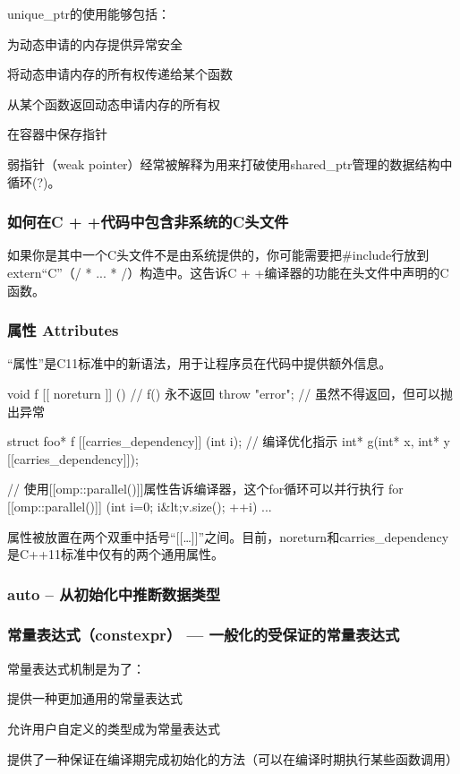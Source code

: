 unique_ptr的使用能够包括：
\begindot
\item 为动态申请的内存提供异常安全
\item 将动态申请内存的所有权传递给某个函数
\item 从某个函数返回动态申请内存的所有权
\item 在容器中保存指针
\myenddot

弱指针（weak pointer）经常被解释为用来打破使用shared_ptr管理的数据结构中循环(?)。

\subsubsection{如何在C + +代码中包含非系统的C头文件}
如果你是其中一个C头文件不是由系统提供的，你可能需要把\#include行放到extern“C”（/ * ... * /）构造中。这告诉C + +编译器的功能在头文件中声明的C函数。
\subsubsection{属性 Attributes}
“属性”是C11标准中的新语法，用于让程序员在代码中提供额外信息。
\begin{Code}
	void f [[ noreturn ]] () // f() 永不返回
	{
		throw "error"; // 虽然不得返回，但可以抛出异常
	}
		
	struct foo* f [[carries_dependency]] (int i); // 编译优化指示
	int* g(int* x, int* y [[carries_dependency]]);
	
	// 使用[[omp::parallel()]]属性告诉编译器，这个for循环可以并行执行
	for [[omp::parallel()]] (int i=0; i&lt;v.size(); ++i) { ... }	
\end{Code}

属性被放置在两个双重中括号“[[…]]”之间。目前，noreturn和carries_dependency是C++11标准中仅有的两个通用属性。

\subsubsection{auto – 从初始化中推断数据类型}
\subsubsection{常量表达式（constexpr） — 一般化的受保证的常量表达式}
常量表达式机制是为了：

提供一种更加通用的常量表达式

允许用户自定义的类型成为常量表达式

提供了一种保证在编译期完成初始化的方法（可以在编译时期执行某些函数调用）


